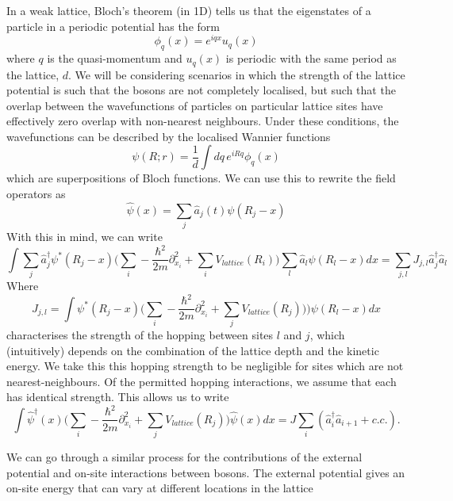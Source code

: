 \documentclass[a4paper,10pt]{article}
\begin{document}
In a weak lattice, Bloch's theorem (in 1D) tells us that the eigenstates of a particle in a periodic potential has the form
\begin{equation}
 \phi_q(x)=e^{iqx}u_{q}(x)
\end{equation}
where $q$ is the quasi-momentum and $u_q(x)$ is periodic with the same period as the lattice, $d$. We will be considering scenarios in which the strength of the lattice potential
is such that the bosons are not completely localised, but such that the overlap between the wavefunctions of particles on particular lattice sites have effectively zero overlap 
with non-nearest neighbours. Under these conditions, the wavefunctions can be described by the localised Wannier functions
\begin{equation}
\psi(R;r)=\frac{1}{d}\int dq\, e^{iRq}\phi_q(x)
\end{equation}
which are superpositions of Bloch functions. We can use this to rewrite the field operators as 
\begin{equation}
 \hat{\psi}(x)=\sum_j \hat{a}_{j}(t)\psi(R_j-x)
\end{equation}
With this in mind, we can write
\begin{equation}
 \int  \sum_j\hat{a}_j^{\dagger}\psi^{*}(R_j-x) \bigg(  \sum_{i}-\frac{\hbar^{2}}{2m}  \partial_{x_{i}}^2+\sum_{i}V_{lattice}(R_{i})  \bigg)  \sum_l  \hat{a}_l\psi(R_l-x)dx=\sum_{j,l} J_{j,l}\hat{a}_{j}^{\dagger}\hat{a}_l
\end{equation}
Where
\begin{equation}
 J_{j,l}=\int  \psi^{*}(R_j-x) \bigg(  \sum_{i}-\frac{\hbar^{2}}{2m}  \partial_{x_{i}}^2+\sum_{j}V_{lattice}(R_{j}))  \bigg)  \psi(R_l-x)dx
\end{equation}
characterises the strength of the hopping between sites $l$ and $j$, which (intuitively) depends on the combination of the lattice depth and the kinetic energy. We take this this hopping strength to be negligible
for sites which are not nearest-neighbours. Of the permitted hopping interactions, we assume that each has identical strength. This allows us to write
\begin{equation}
 \int  \hat{\psi}^{\dagger}(x) \bigg(  \sum_{i}-\frac{\hbar^{2}}{2m}  \partial_{x_{i}}^2+\sum_{j}V_{lattice}(R_{j})  \bigg)    \hat{\psi}(x)dx=J\sum_{i}(\hat{a}^\dagger_{i}\hat{a}_{i+1}+c.c.).
\end{equation}

We can go through a similar process for the contributions of the external potential and on-site interactions between bosons. The external potential gives an on-site energy that can vary
at different locations in the lattice
\end{document}
